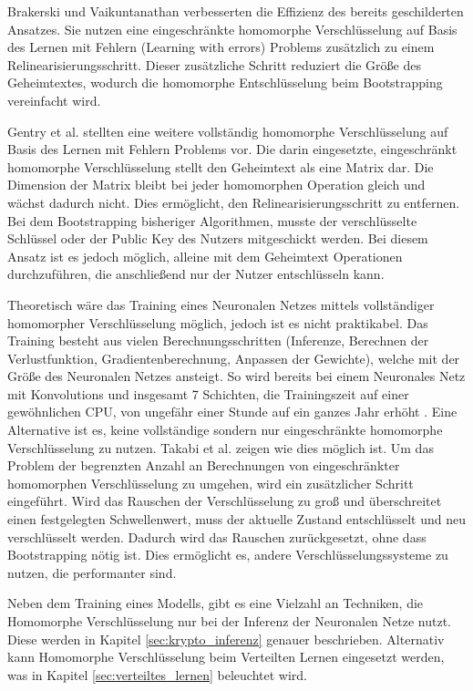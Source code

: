 Brakerski und Vaikuntanathan \cite{P-101} verbesserten die Effizienz des bereits geschilderten Ansatzes.
Sie nutzen eine eingeschränkte homomorphe Verschlüsselung auf Basis des Lernen mit Fehlern (Learning with errors) Problems zusätzlich zu einem Relinearisierungsschritt.
Dieser zusätzliche Schritt reduziert die Größe des Geheimtextes, wodurch die homomorphe Entschlüsselung beim Bootstrapping vereinfacht wird.

Gentry et al. \cite{P-102} stellten eine weitere vollständig homomorphe Verschlüsselung auf Basis des Lernen mit Fehlern Problems vor.
Die darin eingesetzte, eingeschränkt homomorphe Verschlüsselung stellt den Geheimtext als eine Matrix dar.
Die Dimension der Matrix bleibt bei jeder homomorphen Operation gleich und wächst dadurch nicht.
Dies ermöglicht, den Relinearisierungsschritt zu entfernen.
Bei dem Bootstrapping bisheriger Algorithmen, musste der verschlüsselte Schlüssel oder der Public Key des Nutzers mitgeschickt werden.
Bei diesem Ansatz ist es jedoch möglich, alleine mit dem Geheimtext Operationen durchzuführen, die anschließend nur der Nutzer entschlüsseln kann.


Theoretisch wäre das Training eines Neuronalen Netzes mittels vollständiger homomorpher Verschlüsselung möglich, jedoch ist es nicht praktikabel. 
Das Training besteht aus vielen Berechnungsschritten (Inferenze, Berechnen der Verlustfunktion, Gradientenberechnung, Anpassen der Gewichte), welche mit der Größe des Neuronalen Netzes ansteigt.
So wird bereits bei einem Neuronales Netz mit Konvolutions und insgesamt 7 Schichten, die Trainingszeit auf einer gewöhnlichen CPU, von ungefähr einer Stunde auf ein ganzes Jahr erhöht \cite{P-103}.
Eine Alternative ist es, keine vollständige sondern nur eingeschränkte homomorphe Verschlüsselung zu nutzen.
Takabi et al. \cite{P-104} zeigen wie dies möglich ist.
Um das Problem der begrenzten Anzahl an Berechnungen von eingeschränkter homomorphen Verschlüsselung zu umgehen, wird ein zusätzlicher Schritt eingeführt. 
Wird das Rauschen der Verschlüsselung zu groß und überschreitet einen festgelegten Schwellenwert, muss der aktuelle Zustand entschlüsselt und neu verschlüsselt werden.
Dadurch wird das Rauschen zurückgesetzt, ohne dass Bootstrapping nötig ist.
Dies ermöglicht es, andere Verschlüsselungssysteme zu nutzen, die performanter sind.


Neben dem Training eines Modells, gibt es eine Vielzahl an Techniken, die Homomorphe Verschlüsselung nur bei der Inferenz der Neuronalen Netze nutzt. 
Diese werden in Kapitel \ref{sec:krypto_inferenz} genauer beschrieben.
Alternativ kann Homomorphe Verschlüsselung beim Verteilten Lernen eingesetzt werden, was in Kapitel \ref{sec:verteiltes_lernen} beleuchtet wird. 




